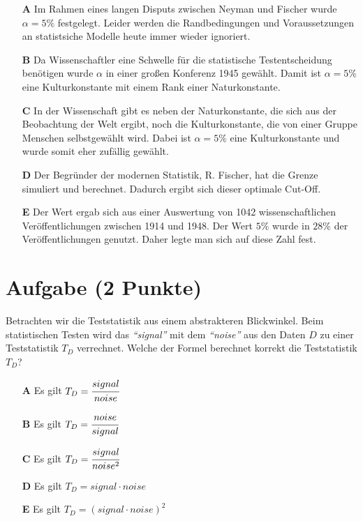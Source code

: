 \documentclass[a4paper, 9pt]{scrartcl}\usepackage[]{graphicx}\usepackage[]{xcolor}
\begin{document}
\begin{enumerate}
\item [\textbf{A} \msquare] Im Rahmen eines langen Disputs zwischen Neyman und Fischer wurde $\alpha = 5\%$ festgelegt. Leider werden die Randbedingungen und Voraussetzungen an statistsiche Modelle heute immer wieder ignoriert.
\item [\textbf{B} \msquare] Da Wissenschaftler eine Schwelle für die statistische Testentscheidung benötigen wurde $\alpha$ in einer großen Konferenz 1945 gewählt. Damit ist $\alpha = 5\%$ eine Kulturkonstante mit einem Rank einer Naturkonstante.
\item [\textbf{C} \msquare] In der Wissenschaft gibt es neben der Naturkonstante, die sich aus der Beobachtung der Welt ergibt, noch die Kulturkonstante, die von einer Gruppe Menschen selbstgewählt wird. Dabei ist $\alpha = 5\%$ eine Kulturkonstante und wurde somit eher zufällig gewählt.
\item [\textbf{D} \msquare] Der Begründer der modernen Statistik, R. Fischer, hat die Grenze simuliert und berechnet. Dadurch ergibt sich dieser optimale Cut-Off.
\item [\textbf{E} \msquare] Der Wert ergab sich aus einer Auswertung von 1042 wissenschaftlichen Veröffentlichungen zwischen 1914 und 1948. Der Wert $5\%$ wurde in $28\%$ der Veröffentlichungen genutzt. Daher legte man sich auf diese Zahl fest.
\end{enumerate}

\section{Aufgabe \hfill (2 Punkte)}

Betrachten wir die Teststatistik aus einem abstrakteren Blickwinkel. Beim
statistischen Testen wird das \textit{"`signal"'} mit dem
\textit{"`noise"'} aus den Daten $D$ zu einer Teststatistik $T_D$ verrechnet. Welche der Formel
berechnet korrekt die Teststatistik $T_D$?



\begin{enumerate}
\item [\textbf{A} \msquare] Es gilt $T_D = \cfrac{signal}{noise}$
\item [\textbf{B} \msquare] Es gilt $T_D = \cfrac{noise}{signal}$
\item [\textbf{C} \msquare] Es gilt $T_D = \cfrac{signal}{noise^2}$
\item [\textbf{D} \msquare] Es gilt $T_D = signal \cdot noise$
\item [\textbf{E} \msquare] Es gilt $T_D = (signal \cdot noise)^2$
\end{enumerate}
\end{document}
